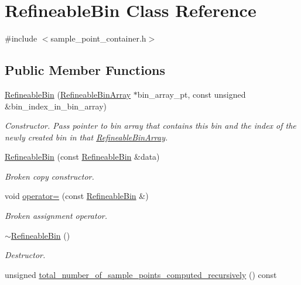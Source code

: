 \hypertarget{classRefineableBin}{}\section{Refineable\+Bin Class Reference}
\label{classRefineableBin}


{\ttfamily \#include $<$sample\+\_\+point\+\_\+container.\+h$>$}

\subsection*{Public Member Functions}
\begin{DoxyCompactItemize}
\item 
\hyperlink{classRefineableBin_ab840fa275927998ba2f51ec7ef46235c}{Refineable\+Bin} (\hyperlink{classRefineableBinArray}{Refineable\+Bin\+Array} $\ast$bin\+\_\+array\+\_\+pt, const unsigned \&bin\+\_\+index\+\_\+in\+\_\+bin\+\_\+array)
\begin{DoxyCompactList}\small\item\em Constructor. Pass pointer to bin array that contains this bin and the index of the newly created bin in that \hyperlink{classRefineableBinArray}{Refineable\+Bin\+Array}. \end{DoxyCompactList}\item 
\hyperlink{classRefineableBin_a41875de39485fe116c5e22dcea65f3ab}{Refineable\+Bin} (const \hyperlink{classRefineableBin}{Refineable\+Bin} \&data)
\begin{DoxyCompactList}\small\item\em Broken copy constructor. \end{DoxyCompactList}\item 
void \hyperlink{classRefineableBin_a22fae65a9869b4222a2ff1c8afe43661}{operator=} (const \hyperlink{classRefineableBin}{Refineable\+Bin} \&)
\begin{DoxyCompactList}\small\item\em Broken assignment operator. \end{DoxyCompactList}\item 
\hyperlink{classRefineableBin_a844cf253cd0a1c9a348bc93e0d96fda4}{$\sim$\+Refineable\+Bin} ()
\begin{DoxyCompactList}\small\item\em Destructor. \end{DoxyCompactList}\item 
unsigned \hyperlink{classRefineableBin_a73cb9b1ac53b5337f2bb2476e2084bb9}{total\+\_\+number\+\_\+of\+\_\+sample\+\_\+points\+\_\+computed\+\_\+recursively} () const

\end{DoxyCompactItemize}
